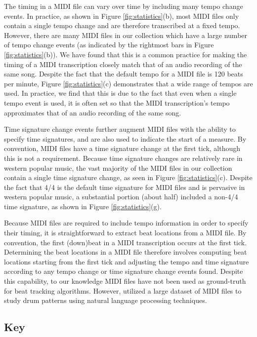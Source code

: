 \documentclass{article}
\begin{document}
The timing in a MIDI file can vary over time by including many tempo change events.
In practice, as shown in Figure \ref{fig:statistics}(b), most MIDI files only contain a single tempo change and are therefore transcribed at a fixed tempo.
However, there are many MIDI files in our collection which have a large number of tempo change events (as indicated by the rightmost bars in Figure \ref{fig:statistics}(b)).
We have found that this is a common practice for making the timing of a MIDI transcription closely match that of an audio recording of the same song.
Despite the fact that the default tempo for a MIDI file is 120 beats per minute, Figure \ref{fig:statistics}(c) demonstrates that a wide range of tempos are used.
In practice, we find that this is due to the fact that even when a single tempo event is used, it is often set so that the MIDI transcription's tempo approximates that of an audio recording of the same song.

Time signature change events further augment MIDI files with the ability to specify time signatures, and are also used to indicate the start of a measure.
By convention, MIDI files have a time signature change at the first tick, although this is not a requirement.
Because time signature changes are relatively rare in western popular music, the vast majority of the MIDI files in our collection contain a single time signature change, as seen in Figure \ref{fig:statistics}(c).
Despite the fact that 4/4 is the default time signature for MIDI files and is pervasive in western popular music, a substantial portion (about half) included a non-4/4 time signature, as shown in Figure \ref{fig:statistics}(g).

Because MIDI files are required to include tempo information in order to specify their timing, it is straightforward to extract beat locations from a MIDI file.
By convention, the first (down)beat in a MIDI transcription occurs at the first tick.
Determining the beat locations in a MIDI file therefore involves computing beat locations starting from the first tick and adjusting the tempo and time signature according to any tempo change or time signature change events found.
Despite this capability, to our knowledge MIDI files have not been used as ground-truth for beat tracking algorithms.
However, \cite{mauch2012corpus} utilized a large dataset of MIDI files to study drum patterns using natural language processing techniques.


\subsection{Key}
\end{document}
